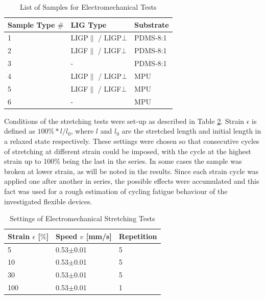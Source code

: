 \begin{table}[H]
\centering
    \caption{List of Samples for Electromechanical Tests}
    \label{tab:LIG_stripes_electromechanical_tests} 
\medskip
\medskip
\begin{tabular}{ l | l | l  } 

Sample Type $\#$& LIG Type\footnotemark[1] & Substrate \\[15px]
\hline
1 & LIGP$\parallel$ / LIGP$\bot$    & PDMS-8:1 \\[13px]
2 & LIGF$\parallel$ / LIGF$\bot$      & PDMS-8:1 \\[13px]
3 & -        & PDMS-8:1 \\[13px]
4 & LIGP$\parallel$ / LIGP$\bot$     & MPU \\[13px]
5 & LIGF$\parallel$ / LIGF$\bot$     & MPU \\[13px]
6 & -        & MPU \\[10px]

\end{tabular}
\end{table}


Conditions of the stretching tests were set-up as described in Table \ref{tab:stretcher_settings}. Strain $\epsilon$ is defined as $100\%*l/l_0$, where $l$ and $l_0$ are the stretched length and initial length in a relaxed state respectively. These settings were chosen so that consecutive cycles of stretching at different strain could be imposed, with the cycle at the highest strain up to 100$\%$ being the last in the series. In some cases the sample  was broken at lower strain, as will be noted in the results. Since each strain cycle was applied one after another in series, the possible effects were accumulated and this fact was used for a rough estimation of cycling fatigue behaviour of the investigated flexible devices. 

\begin{table}[H]
\centering
    \caption{Settings of Electromechanical Stretching Tests}
    \label{tab:stretcher_settings} 
\medskip
\medskip
\begin{tabular}{ l | l | l } 

Strain $\epsilon$ [$\%$] & Speed $v$ [mm/s] & Repetition \\[15px]
\hline
5 & 0.53$\pm$0.01 & 5\\[13px]
10 & 0.53$\pm$0.01 & 5\\[13px]
30 & 0.53$\pm$0.01 & 5\\[13px]
100 & 0.53$\pm$0.01 & 1\\[13px]
\end{tabular}
\end{table}

